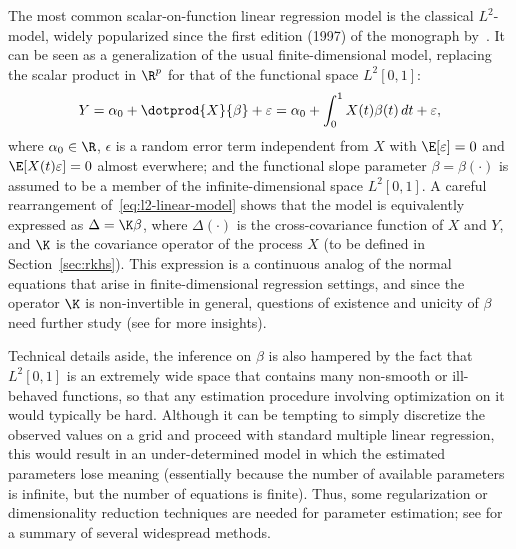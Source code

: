 The most common scalar-on-function linear regression model is the classical \(L^2\)-model, widely popularized since the first edition (1997) of the monograph by~\citet{ramsay2005functional}. It can be seen as a generalization of the usual finite-dimensional model, replacing the scalar product in \(\R^p\) for that of the functional space \(L^2[0,1]\):
\begin{equation}\label{eq:l2-linear-model}
Y = \alpha_0 + \dotprod{X}{\beta} + \epsilon = \alpha_0 + \int_0^1 X(t)\beta(t)\, dt + \epsilon,
\end{equation}
where \(\alpha_0\in \R\), \(\epsilon\) is a random error term independent from \(X\) with \(\E [\epsilon]=0\) and \(\E[X(t)\epsilon]=0\) almost everwhere; and the functional slope parameter \(\beta=\beta(\cdot)\) is assumed to be a member of the infinite-dimensional space \(L^2[0, 1]\). A careful rearrangement of~\eqref{eq:l2-linear-model} shows that the model is equivalently expressed as \(\Delta=\K\beta\), where \(\Delta(\cdot)\) is the cross-covariance function of \(X\) and \(Y\), and \(\K\) is the covariance operator of the process \(X\) (to be defined in Section~\ref{sec:rkhs}). This expression is a continuous analog of the normal equations that arise in finite-dimensional regression settings, and since the operator \(\K\) is non-invertible in general, questions of existence and unicity of \(\beta\) need further study (see \citet{cardot2011functional} for more insights).

Technical details aside, the inference on \(\beta\) is also hampered by the fact that \(L^2[0,1]\) is an extremely wide space that contains many non-smooth or ill-behaved functions, so that any estimation procedure involving optimization on it would typically be hard.
Although it can be tempting to simply discretize the observed values on a grid and proceed with standard multiple linear regression, this would result in an under-determined model in which the estimated parameters lose meaning (essentially because the number of available parameters is infinite, but the number of equations is finite). Thus, some regularization or dimensionality reduction techniques are needed for parameter estimation; see \citet{reiss2017methods} for a summary of several widespread methods.

